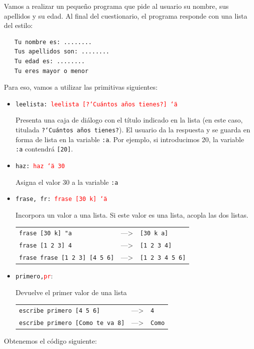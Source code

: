 \documentclass[12pt,twoside,spanish,a4paper]{report}
\begin{document}
Vamos a realizar un peque\~no programa que pide al usuario su nombre,
sus apellidos y su edad. Al final del cuestionario, el programa responde
con una lista del estilo:
\begin{verbatim}
   Tu nombre es: ........
   Tus apellidos son: ........
   Tu edad es: ........
   Tu eres mayor o menor \end{verbatim}
Para eso, vamos a utilizar las primitivas siguientes:
\begin{itemize}
   \item \texttt{leelista: \hspace{3.8cm}
      \textcolor{red}{leelista [?`Cu\'antos a\~nos tienes?] \char`\"{}a}}

      Presenta una caja de di\'alogo con el t\'itulo indicado en la lista
      (en este caso, titulada \texttt{?`Cu\'antos a\~nos tienes?}). El
      usuario da la respuesta y se guarda en forma de lista en la variable
      \texttt{:a}. Por ejemplo, si introducimos 20, la variable \texttt{:a}
      contendr\'a \texttt{[20]}.
   \item \texttt{haz: \hspace{5cm} \textcolor{red}{haz \char`\"{}a 30}}

      Asigna el valor 30 a la variable \texttt{:a}
   \item \texttt{frase, fr: \hspace{4cm} \textcolor{red}{frase [30 k] \char`\"{}a}}

      Incorpora un valor a una lista. Si este valor es una lista, acopla
      las dos listas.

      \begin{tabular}{lcl}
         \verb+frase [30 k] "a+ & ---> & \verb+[30 k a]+ \\
         \verb+frase [1 2 3] 4+ & ---> & \verb+[1 2 3 4]+ \\
         \verb+frase frase [1 2 3] [4 5 6]+ & ---> & \verb+[1 2 3 4 5 6]+ \\
      \end{tabular}
   \item \texttt{primero,\hspace{4cm}\textcolor{red}{pr}}:

      Devuelve el primer valor de una lista

      \begin{tabular}{lcl}
         \verb+escribe primero [4 5 6]+ & ---> & \verb+4+ \\
         \verb+escribe primero [Como te va 8]+ & ---> & \verb+Como+ \\
      \end{tabular}
\end{itemize}
\noindent Obtenemos el c\'odigo siguiente:
\end{document}
